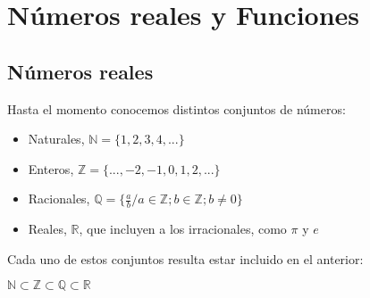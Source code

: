 \documentclass[Análisis.root.tex]{subfiles}
\newcommand{\N}{\mathbb{N}}
\newcommand{\Z}{\mathbb{Z}}
\newcommand{\Q}{\mathbb{Q}}
\newcommand{\R}{\mathbb{R}}
\begin{document}
    \section{Números reales y Funciones}
    \subsection{Números reales}
        Hasta el momento conocemos distintos conjuntos de números:
        \begin{itemize}
            \item Naturales, \(\N = \{1,2,3,4,...\}\)
            \item Enteros, \(\Z = \{...,-2,-1,0,1,2,...\}\)
            \item Racionales, \(\Q = \{\frac{a}{b} / a \in \Z; b \in \Z;b \ne 0\}\)
            \item Reales, \(\R\), que incluyen a los irracionales, como \(\pi\) y \(e\)
        \end{itemize}
        Cada uno de estos conjuntos resulta estar incluido en el anterior:
        \begin{center}
            \(\N \subset \Z \subset \Q \subset \R\)
        \end{center}
        \begin{center}
        \end{center}
\end{document}
